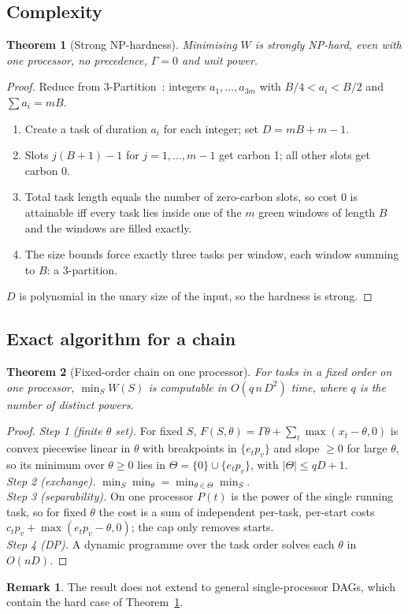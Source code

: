\documentclass[conference,11pt]{IEEEtran}
\newtheorem{theorem}{Theorem}
\theoremstyle{definition}\newtheorem{remark}{Remark}
\begin{document}
\subsection{Complexity}
\begin{theorem}[Strong NP-hardness]\label{thm:hard}
Minimising $W$ is strongly NP-hard, even with one processor, no precedence, $\Gamma=0$ and unit power.
\end{theorem}
\begin{proof}
Reduce from 3-Partition~\cite{gj79}: integers $a_1,\dots,a_{3m}$ with $B/4<a_i<B/2$ and $\sum a_i=mB$.
\begin{enumerate}
\item Create a task of duration $a_i$ for each integer; set $D=mB+m-1$.
\item Slots $j(B+1)-1$ for $j=1,\dots,m-1$ get carbon 1; all other slots get carbon 0.
\item Total task length equals the number of zero-carbon slots, so cost 0 is attainable iff every task lies inside one of the $m$ green windows of length $B$ and the windows are filled exactly.
\item The size bounds force exactly three tasks per window, each window summing to $B$: a 3-partition.
\end{enumerate}
$D$ is polynomial in the unary size of the input, so the hardness is strong.
\end{proof}

\subsection{Exact algorithm for a chain}
\begin{theorem}[Fixed-order chain on one processor]\label{thm:chain}
For tasks in a fixed order on one processor, $\min_SW(S)$ is computable in $O(q\,n\,D^2)$ time, where $q$ is the number of distinct powers.
\end{theorem}
\begin{proof}
\emph{Step 1 (finite $\theta$ set).} For fixed $S$, $F(S,\theta)=\Gamma\theta+\sum_t\max(x_t-\theta,0)$ is convex piecewise linear in $\theta$ with breakpoints in $\{e_tp_v\}$ and slope $\ge0$ for large $\theta$, so its minimum over $\theta\ge0$ lies in $\Theta=\{0\}\cup\{e_tp_v\}$, with $|\Theta|\le qD+1$.\\
\emph{Step 2 (exchange).} $\min_S\min_\theta=\min_{\theta\in\Theta}\min_S$.\\
\emph{Step 3 (separability).} On one processor $P(t)$ is the power of the single running task, so for fixed $\theta$ the cost is a sum of independent per-task, per-start costs $c_tp_v+\max(e_tp_v-\theta,0)$; the cap only removes starts.\\
\emph{Step 4 (DP).} A dynamic programme over the task order solves each $\theta$ in $O(nD)$.
\end{proof}
\begin{remark}
The result does not extend to general single-processor DAGs, which contain the hard case of Theorem~\ref{thm:hard}.
\end{remark}
\end{document}
